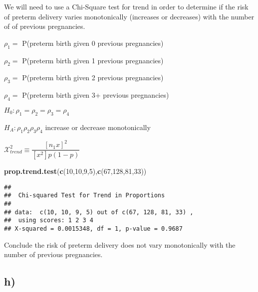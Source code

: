 \documentclass[]{article}
\newenvironment{Shaded}{\begin{snugshade}}{\end{snugshade}}
\newcommand{\KeywordTok}[1]{\textcolor[rgb]{0.13,0.29,0.53}{\textbf{#1}}}
\newcommand{\DataTypeTok}[1]{\textcolor[rgb]{0.13,0.29,0.53}{#1}}
\newcommand{\DecValTok}[1]{\textcolor[rgb]{0.00,0.00,0.81}{#1}}
\newcommand{\OperatorTok}[1]{\textcolor[rgb]{0.81,0.36,0.00}{\textbf{#1}}}
\newcommand{\NormalTok}[1]{#1}
\begin{document}
We will need to use a Chi-Square test for trend in order to determine if
the risk of preterm delivery varies monotonically (increases or
decreases) with the number of of previous pregnancies.

\(\rho_1=\) P(preterm birth given 0 previous pregnancies)

\(\rho_2=\) P(preterm birth given 1 previous pregnancies)

\(\rho_3=\) P(preterm birth given 2 previous pregnancies)

\(\rho_4=\) P(preterm birth given 3+ previous pregnancies)

\(H_0: \rho_1=\rho_2=\rho_3=\rho_4\)

\(H_A: \rho_1 \rho_2 \rho_3 \rho_4\) increase or decrease monotonically

\(\mathcal{X}^2_{trend}\equiv \dfrac{[n_1x]^2}{[x^2]p(1-p)}\)

\begin{Shaded}
\begin{Highlighting}[]
\KeywordTok{prop.trend.test}\NormalTok{(}\KeywordTok{c}\NormalTok{(}\DecValTok{10}\NormalTok{,}\DecValTok{10}\NormalTok{,}\DecValTok{9}\NormalTok{,}\DecValTok{5}\NormalTok{),}\KeywordTok{c}\NormalTok{(}\DecValTok{67}\NormalTok{,}\DecValTok{128}\NormalTok{,}\DecValTok{81}\NormalTok{,}\DecValTok{33}\NormalTok{))}
\end{Highlighting}
\end{Shaded}

\begin{verbatim}
## 
##  Chi-squared Test for Trend in Proportions
## 
## data:  c(10, 10, 9, 5) out of c(67, 128, 81, 33) ,
##  using scores: 1 2 3 4
## X-squared = 0.0015348, df = 1, p-value = 0.9687
\end{verbatim}

Conclude the risk of preterm delivery does not vary monotonically with
the number of previous pregnancies.

\subsection{h)}\label{h}

\begin{Shaded}
\end{Shaded}
\end{document}
